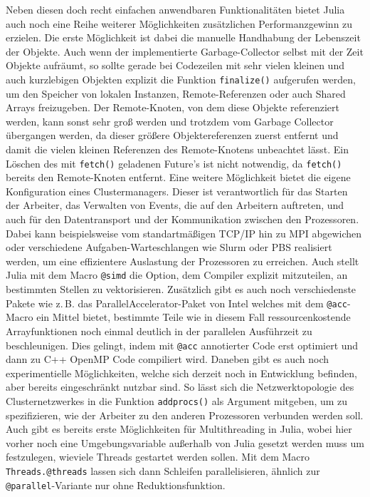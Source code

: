 \documentclass[proseminar,german,utf8]{zihpub}
\newcommand{\zB}[0]{{z.\,B. }}
\begin{document}
Neben diesen doch recht einfachen anwendbaren Funktionalitäten bietet Julia auch noch eine Reihe weiterer Möglichkeiten zusätzlichen Performanzgewinn zu erzielen. Die erste Möglichkeit ist dabei die manuelle Handhabung der Lebenszeit der Objekte. Auch wenn der implementierte Garbage-Collector selbst mit der Zeit Objekte aufräumt, so sollte gerade bei Codezeilen mit sehr vielen kleinen und auch kurzlebigen Objekten explizit die Funktion \verb|finalize()| aufgerufen werden, um den Speicher von lokalen Instanzen, Remote-Referenzen oder auch Shared Arrays freizugeben. Der Remote-Knoten, von dem diese Objekte referenziert werden, kann sonst sehr groß werden und trotzdem vom Garbage Collector übergangen werden, da dieser größere Objektereferenzen zuerst entfernt und damit die vielen kleinen Referenzen des Remote-Knotens unbeachtet lässt. Ein Löschen des mit \verb|fetch()| geladenen Future's ist nicht notwendig, da \verb|fetch()| bereits den Remote-Knoten entfernt. Eine weitere Möglichkeit bietet die eigene Konfiguration eines Clustermanagers. Dieser ist verantwortlich für das Starten der Arbeiter, das Verwalten von Events, die auf den Arbeitern auftreten, und auch für den Datentransport und der Kommunikation zwischen den Prozessoren. Dabei kann beispielsweise vom standartmäßigen TCP/IP hin zu MPI abgewichen oder verschiedene Aufgaben-Warteschlangen wie Slurm oder PBS realisiert werden, um eine effizientere Auslastung der Prozessoren zu erreichen. Auch stellt Julia mit dem Macro \verb|@simd| die Option, dem Compiler explizit mitzuteilen, an bestimmten Stellen zu vektorisieren. Zusätzlich gibt es auch noch verschiedenste Pakete wie \zB das ParallelAccelerator-Paket von Intel welches mit dem \verb|@acc|-Macro ein Mittel bietet, bestimmte Teile wie in diesem Fall ressourcenkostende Arrayfunktionen noch einmal deutlich in der parallelen Ausführzeit zu beschleunigen. Dies gelingt, indem mit  \verb|@acc| annotierter Code erst optimiert und dann zu C++ OpenMP Code compiliert wird. Daneben gibt es auch noch experimentielle Möglichkeiten, welche sich derzeit noch in Entwicklung befinden, aber bereits eingeschränkt nutzbar sind. So lässt sich die Netzwerktopologie des Clusternetzwerkes in die Funktion \verb|addprocs()| als Argument mitgeben, um zu spezifizieren, wie der Arbeiter zu den anderen Prozessoren verbunden werden soll. Auch gibt es bereits erste Möglichkeiten für Multithreading in Julia, wobei hier vorher noch eine Umgebungsvariable außerhalb von Julia gesetzt werden muss um festzulegen, wieviele Threads gestartet werden sollen. Mit dem Macro \verb|Threads.@threads| lassen sich dann Schleifen parallelisieren, ähnlich zur \verb|@parallel|-Variante nur ohne Reduktionsfunktion.~\cite{JuliaLangDocumentation}~\cite{JuliaLangParallelAccelerator}
\end{document}

